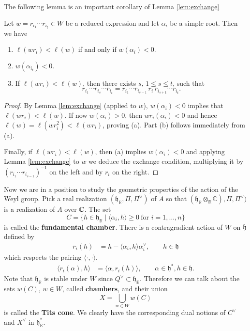 \documentclass[12pt]{article}
\begin{document}
The following lemma is an important corollary of Lemma \ref{lem:exchange}

\begin{lemma}
Let $w = r_{i_1}\cdots r_{i_t} \in W$ be a reduced expression and let $\alpha_i$ 
be a simple root. Then we have
\begin{enumerate}[label=(\alph*)]
\item $\ell(wr_i) < \ell(w)$ if and only if $w(\alpha_i) < 0$.
\item $w(\alpha_{i_t}) < 0$.
\item If $\ell(wr_i) < \ell(w)$, then there exists $s$, 
$1 \leq s \leq t$, such that
\[
   r_{i_1}\cdots r_{i_s}\cdots r_{i_t} = r_{i_1}\cdots r_{i_{s-1}}\, r_i\, r_{i_{s+1}}\cdots r_{i_t}.
\]
\end{enumerate}
\end{lemma}

\begin{proof}
By Lemma \ref{lem:exchange} (applied to $w$), $w(\alpha_i)<0$ implies that $\ell(wr_i)<\ell(w)$. 
If now $w(\alpha_i) > 0$, then $wr_i(\alpha_i)<0$ and hence $\ell(w) = \ell(wr_i^2) < \ell(wr_i)$, proving (a). 
Part (b) follows immediately from (a). 

Finally, if $\ell(wr_i)<\ell(w)$, then (a) implies $w(\alpha_i)<0$ and applying 
Lemma \ref{lem:exchange} to $w$ we deduce the exchange condition, multiplying it 
by $(r_{i_1}\cdots r_{i_{s-1}})^{-1}$ on the left and by $r_i$ on the right.
\end{proof}

Now we are in a position to study the geometric properties of the action of the Weyl group. 
Pick a real realization $(\mathfrak{h}_{\mathbb{R}},\Pi, \Pi^\vee)$ of $A$ so that $(\mathfrak{h}_{\mathbb{R}} \otimes_{\mathbb{R}} \mathbb{C}), \Pi, \Pi^\vee)$ is a realization of $A$ over $\mathbb{C}$. 
The set
\[
   C = \{ h \in \mathfrak{h}_{\mathbb{R}} \mid \langle \alpha_i,h \rangle \geq 0 
   \ \text{for } i=1,\dots,n \}
\]
is called the \textbf{fundamental chamber}. There is a contragradient action of $W$ on $\mathfrak{h}$ defined by \begin{align*}
    r_i(h) &= h - \langle \alpha_i,h \rangle \alpha_i^\vee, \qquad h \in \mathfrak{h}
\end{align*} which respects the pairing $\langle \cdot, \cdot \rangle$. \begin{align*}
    \langle r_i(\alpha), h \rangle &= \langle \alpha, r_i(h) \rangle, \qquad \alpha \in \mathfrak{h}^*, h \in \mathfrak{h}.
\end{align*} Note that $\mathfrak{h}_{\mathbb{R}}$ is stable under $W$ since $Q^\vee \subset \mathfrak{h}_{\mathbb{R}}$. Therefore we can talk about the sets $w(C)$, $w\in W$, called \textbf{chambers}, and their union
\[
   X = \bigcup_{w\in W} w(C)
\]
is called the \textbf{Tits cone}. We clearly have the corresponding dual notions of $C^\vee$ and $X^\vee$ in $\mathfrak{h}_{\mathbb{R}}^*$.
\end{document}
